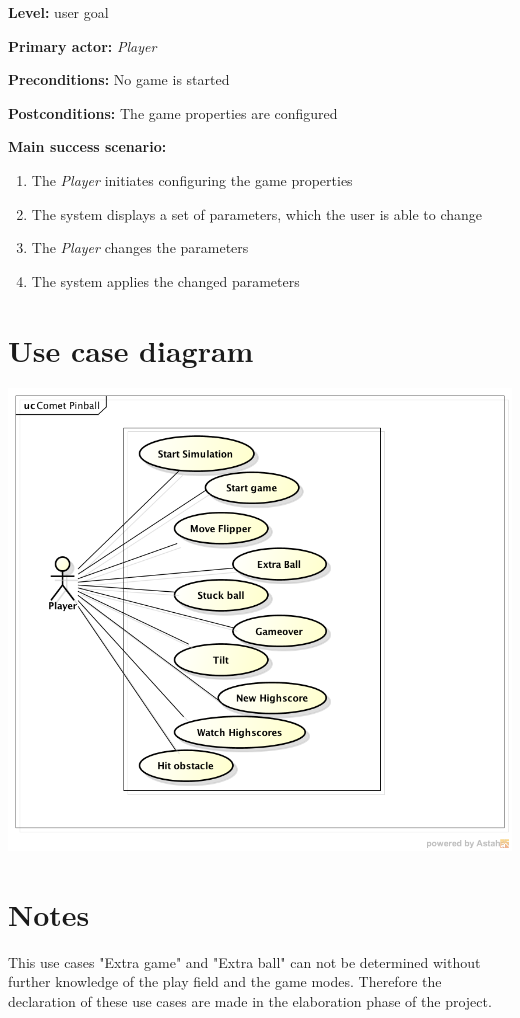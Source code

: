 \documentclass[fontsize=12pt,
               paper=a4,
               twoside=false,
               parskip=half,
               ]{scrartcl}
\begin{document}
\textbf{\textsf{Level:}} user goal

\textbf{\textsf{Primary actor:}} \emph{Player}

\textbf{\textsf{Preconditions:}} No game is started

\textbf{\textsf{Postconditions:}} The game properties are configured

\textbf{\textsf{Main success scenario:}}

\begin{enumerate}[leftmargin=3em]
	\item The \emph{Player} initiates configuring the game properties
	\item The system displays a set of parameters, which the user is able to change
	\item The \emph{Player} changes the parameters
	\item The system applies the changed parameters
\end{enumerate}


\section{Use case diagram}


\includegraphics[width=15cm]{./img/usecase-model.png}

\section{Notes}
This use cases "Extra game" and "Extra ball" can not be determined without further knowledge of the play field and the game modes.
Therefore the declaration of these use cases are made in the elaboration phase of the project.	
\end{document}
